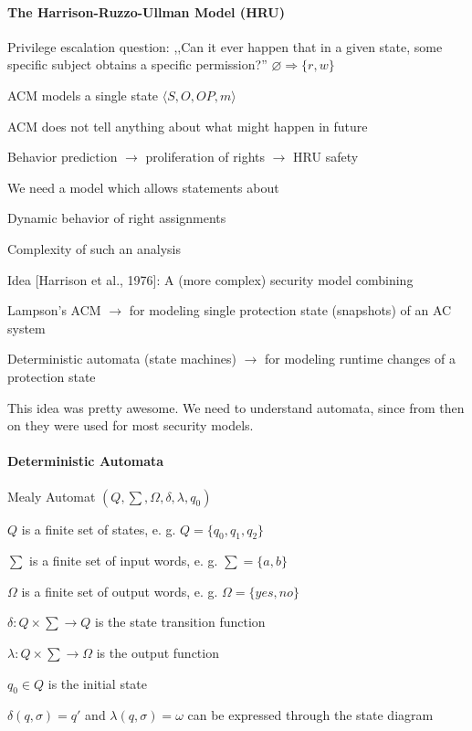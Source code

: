 \documentclass[a4paper]{article}
\begin{document}
\begin{multicols}{3}
    \paragraph{The Harrison-Ruzzo-Ullman Model (HRU)}

    Privilege escalation question: ,,Can it ever happen that in a given state, some specific subject obtains a specific permission?''
    $\varnothing \Rightarrow \{r,w\}$
    \begin{itemize*}
        \item ACM models a single state $\langle S,O,OP,m\rangle$
        \item ACM does not tell anything about what might happen in future
        \item Behavior prediction $\rightarrow$ proliferation of rights $\rightarrow$ HRU safety
    \end{itemize*}

    We need a model which allows statements about
    \begin{itemize*}
        \item Dynamic behavior of right assignments
        \item Complexity of such an analysis
    \end{itemize*}

    Idea [Harrison et al., 1976]: A (more complex) security model combining
    \begin{itemize*}
        \item Lampson’s ACM $\rightarrow$ for modeling single protection state (snapshots) of an AC system
        \item Deterministic automata (state machines) $\rightarrow$ for modeling runtime changes of a protection state
    \end{itemize*}

    This idea was pretty awesome. We need to understand automata, since from then on they were used for most security models.

    \paragraph{Deterministic Automata}
    Mealy Automat $(Q,\sum,\Omega,\delta,\lambda,q_0)$
    \begin{itemize*}
        \item $Q$ is a finite set of states, e. g. $Q=\{q_0 ,q_1 ,q_2\}$
        \item $\sum$ is a finite set of input words, e. g. $\sum=\{a,b\}$
        \item $\Omega$ is a finite set of output words, e. g. $\Omega=\{yes,no\}$
        \item $\delta:Q\times\sum\rightarrow Q$ is the state transition function
        \item $\lambda:Q\times\sum\rightarrow\Omega$ is the output function
        \item $q_0\in Q$ is the initial state
        \item $\delta(q,\sigma)=q'$ and $\lambda(q,\sigma)=\omega$ can be expressed through the state diagram
    \end{itemize*}


\end{multicols}
\end{document}
